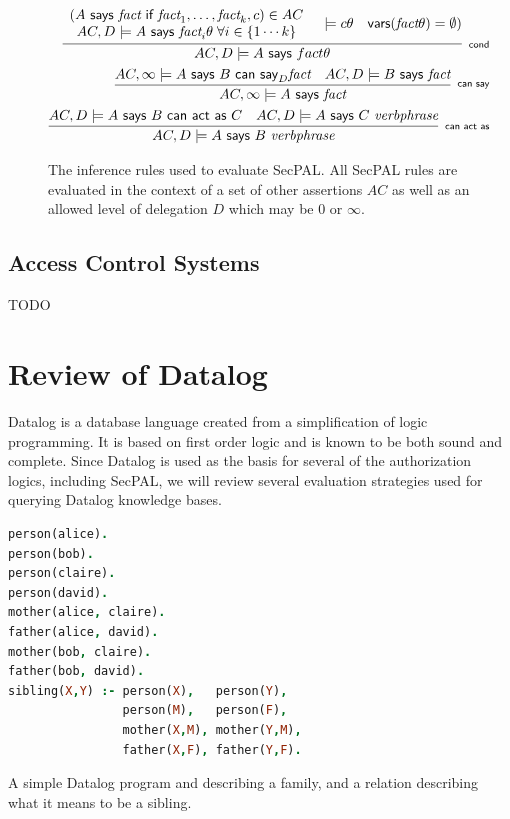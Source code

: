 \documentclass[a4paper,sfsidenotes]{tufte-book}
\begin{document}
\begin{figure}\label{secpal:rules}
  \centering
  \begin{eqnarray*}
    \infer[\textsf{\scriptsize cond}]{%
      AC, D \models A\textsf{~says~}fact\theta
    }{%
      \begin{array}[c]{c}
        \left(A\textsf{~says~}\textit{fact}\textsf{~if~}\textit{fact}_1, \ldots, \textit{fact}_k, c\right) \in AC \\
        AC,D\models A\textsf{~says~}\textit{fact}_i\theta \; \forall i \in \{1\cdots k\}
      \end{array}
      & \models{c\theta}
      & \textsf{vars}(\textit{fact}\theta) = \emptyset)
    }\\
    \infer[\textsf{\scriptsize can say}]{%
      AC, \infty \models A\textsf{~says~}\textit{fact}
    }{%
      AC, \infty \models A\textsf{~says~}B\textsf{~can~say}_D \textit{fact}
      & AC, D \models B\textsf{~says~}\textit{fact}
    } \\
    \infer[\textsf{\scriptsize can act as}]{%
      AC, D \models A\textsf{~says~}B~\textit{verbphrase}
    }{%
      AC, D \models A\textsf{~says~}B\textsf{~can~act~as~}C
      & AC, D \models A\textsf{~says~}C~\textit{verbphrase}
    }
  \end{eqnarray*}
  \caption{The inference rules used to evaluate {SecPAL}. All {SecPAL} rules are
  evaluated in the context of a set of other assertions $AC$ as well as an
  allowed level of delegation $D$ which may be $0$ or $\infty$.}
\end{figure}

\subsection{Access Control Systems}


{\Huge TODO}

\section{Review of Datalog}

Datalog is a database language created from a simplification of logic
programming.  It is based on first order logic and is known to be both sound and
complete.  Since Datalog is used as the basis for several of the authorization
logics, including SecPAL, we will review several evaluation strategies used
for querying Datalog knowledge bases.

\begin{marginfigure}
  \label{datalog:example}
  \begin{lstlisting}[language=Prolog]
person(alice).  
person(bob).
person(claire). 
person(david).
mother(alice, claire).
father(alice, david).
mother(bob, claire).
father(bob, david).
sibling(X,Y) :- person(X),   person(Y),
                person(M),   person(F),
                mother(X,M), mother(Y,M), 
                father(X,F), father(Y,F).
  \end{lstlisting}
  \caption{A simple Datalog program and describing a family, and a relation
  describing what it means to be a sibling.}
\end{marginfigure}
\end{document}
